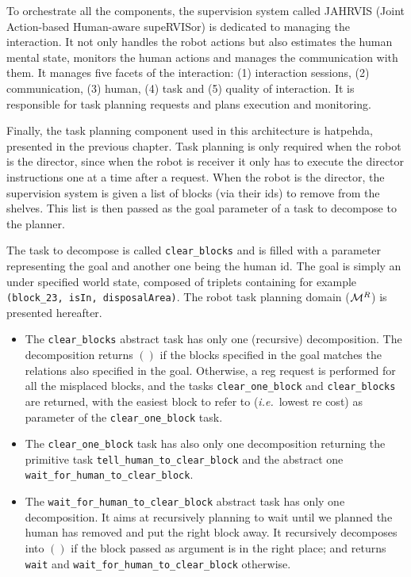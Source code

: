 \documentclass[a4paper,11pt,twoside]{StyleThese}
\begin{document}
To orchestrate all the components, the supervision system called JAHRVIS (Joint Action-based Human-aware supeRVISor) is dedicated to managing the interaction. It not only handles the robot actions but also estimates the human mental state, monitors the human actions and manages the communication with them. It manages five facets of the interaction: (1) interaction sessions, (2) communication, (3) human, (4) task and (5) quality of interaction. It is responsible for task planning requests and plans execution and monitoring.

Finally, the task planning component used in this architecture is \acrshort{hatpehda}, presented in the previous chapter. Task planning is only required when the robot is the director, since when the robot is receiver it only has to execute the director instructions one at a time after a request. When the robot is the director, the supervision system is given a list of blocks (via their ids) to remove from the shelves. This list is then passed as the goal parameter of a task to decompose to the planner.

The task to decompose is called \verb'clear_blocks' and is filled with a parameter representing the goal and another one being the human id. The goal is simply an under specified world state, composed of triplets containing for example \verb'(block_23, isIn, disposalArea)'.
The robot task planning domain ($\mathcal{M}^R$) is presented hereafter. 
\begin{itemize}
\item The \verb'clear_blocks' abstract task has only one (recursive) decomposition. The decomposition returns $()$ if the blocks specified in the goal matches the relations also specified in the goal. Otherwise, a \acrshort{reg} request is performed for all the misplaced blocks, and the tasks \verb'clear_one_block' and \verb'clear_blocks' are returned, with the easiest block to refer to (\textit{i.e.}~lowest \acrshort{re} cost) as parameter of the \verb'clear_one_block' task.
\item The \verb'clear_one_block' task has also only one decomposition returning the primitive task \verb'tell_human_to_clear_block' and the abstract one \verb'wait_for_human_to_clear_block'.
\item The \verb'wait_for_human_to_clear_block' abstract task has only one decomposition. It aims at recursively planning to wait until we planned the human has removed and put the right block away. It recursively decomposes into $()$ if the block passed as argument is in the right place; and returns \verb'wait' and \verb'wait_for_human_to_clear_block' otherwise.
\end{itemize}
\end{document}
